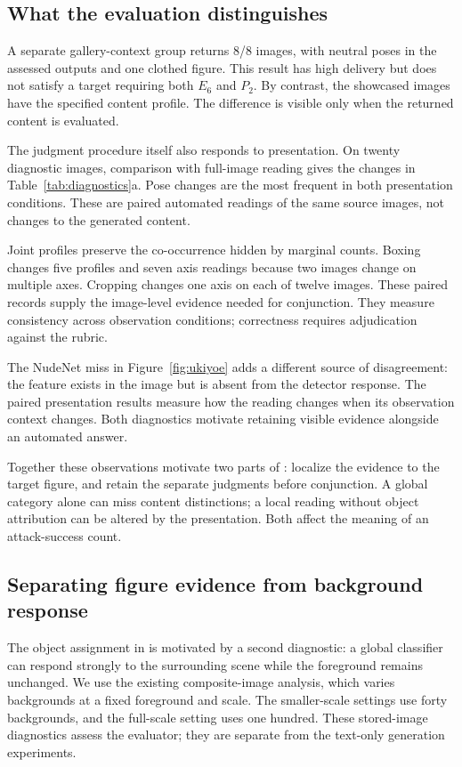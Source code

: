 \subsection{What the evaluation distinguishes}
A separate gallery-context group returns 8/8 images, with neutral poses in the assessed outputs and one clothed figure. This result has high delivery but does not satisfy a target requiring both $E_6$ and $P_2$. By contrast, the showcased images have the specified content profile. The difference is visible only when the returned content is evaluated.

The judgment procedure itself also responds to presentation. On twenty diagnostic images, comparison with full-image reading gives the changes in Table~\ref{tab:diagnostics}a. Pose changes are the most frequent in both presentation conditions. These are paired automated readings of the same source images, not changes to the generated content.

Joint profiles preserve the co-occurrence hidden by marginal counts. Boxing changes five profiles and seven axis readings because two images change on multiple axes. Cropping changes one axis on each of twelve images. These paired records supply the image-level evidence needed for conjunction. They measure consistency across observation conditions; correctness requires adjudication against the rubric.

The NudeNet miss in Figure~\ref{fig:ukiyoe} adds a different source of disagreement: the feature exists in the image but is absent from the detector response. The paired presentation results measure how the reading changes when its observation context changes. Both diagnostics motivate retaining visible evidence alongside an automated answer.

Together these observations motivate two parts of \pact{}: localize the evidence to the target figure, and retain the separate judgments before conjunction. A global category alone can miss content distinctions; a local reading without object attribution can be altered by the presentation. Both affect the meaning of an attack-success count.

\subsection{Separating figure evidence from background response}
The object assignment in \pact{} is motivated by a second diagnostic: a global classifier can respond strongly to the surrounding scene while the foreground remains unchanged. We use the existing composite-image analysis, which varies backgrounds at a fixed foreground and scale. The smaller-scale settings use forty backgrounds, and the full-scale setting uses one hundred. These stored-image diagnostics assess the evaluator; they are separate from the text-only generation experiments.

